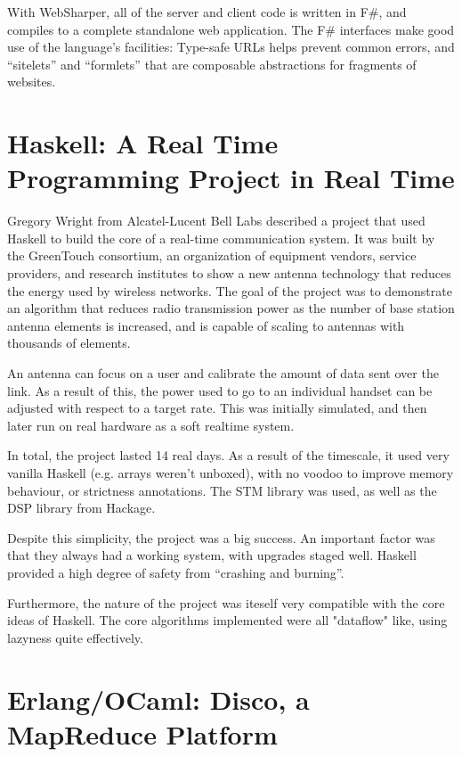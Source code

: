 \documentclass{jfp1}
\begin{document}
With WebSharper, all of the server and client code is written in F\#, and
compiles to a complete standalone web application. The F\# interfaces make good
use of the language's facilities: Type-safe URLs helps prevent common errors,
and ``sitelets'' and ``formlets'' that are composable abstractions for
fragments of websites.

\section{Haskell: A Real Time Programming Project in Real Time}

Gregory Wright from Alcatel-Lucent Bell Labs described a project that used
Haskell to build the core of a real-time communication system.  It was built by
the GreenTouch consortium, an organization of equipment vendors, service
providers, and research institutes to show a new antenna technology that
reduces the energy used by wireless networks.  The goal of the project was to
demonstrate an algorithm that reduces radio transmission power as the number of
base station antenna elements is increased, and is capable of scaling to
antennas with thousands of elements.

An antenna can focus on a user and calibrate the amount of data sent over the
link. As a result of this, the power used to go to an individual handset can be
adjusted with respect to a target rate.  This was initially simulated, and then
later run on real hardware as a soft realtime system.

In total, the project lasted 14 real days. As a result of the timescale, it
used very vanilla Haskell (e.g. arrays weren't unboxed), with no voodoo to
improve memory behaviour, or strictness annotations. The STM library was used,
as well as the DSP library from Hackage.

Despite this simplicity, the project was a big success. An important factor was
that they always had a working system, with upgrades staged well. Haskell
provided a high degree of safety from ``crashing and burning''.

Furthermore, the nature of the project was iteself very compatible with the
core ideas of Haskell. The core algorithms implemented were all "dataflow"
like, using lazyness quite effectively.

\section{Erlang/OCaml: Disco, a MapReduce Platform}
\end{document}
